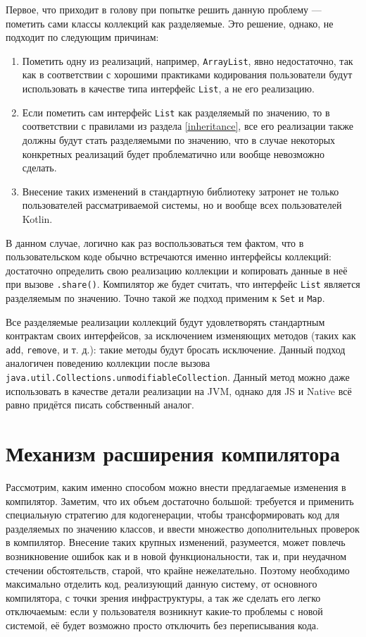 \documentclass[specification,annotation,times]{itmo-student-thesis}
\begin{document}
Первое, что приходит в голову при попытке решить данную проблему --- пометить сами классы коллекций как разделяемые.
Это решение, однако, не подходит по следующим причинам:

\begin{enumerate}
	\item Пометить одну из реализаций, например, \texttt{ArrayList}, явно недостаточно, так как в соответствии с хорошими практиками кодирования пользователи будут использовать в качестве типа интерфейс \texttt{List}, а не его реализацию.
	\item Если пометить сам интерфейс \texttt{List} как разделяемый по значению, то в соответствии с правилами из раздела \ref{inheritance}, все его реализации также должны будут стать разделяемыми по значению, что в случае некоторых конкретных реализаций будет проблематично или вообще невозможно сделать.
	\item Внесение таких изменений в стандартную библиотеку затронет не только пользователей рассматриваемой системы, но и вообще всех пользователей Kotlin.
\end{enumerate}

В данном случае, логично как раз воспользоваться тем фактом, что в пользовательском коде обычно встречаются именно интерфейсы коллекций: достаточно определить свою реализацию коллекции и копировать данные в неё при вызове \texttt{.share()}.
Компилятор же будет считать, что интерфейс \texttt{List} является разделяемым по значению.
Точно такой же подход применим к \texttt{Set} и \texttt{Map}.

Все разделяемые реализации коллекций будут удовлетворять стандартным контрактам своих интерфейсов, за исключением изменяющих методов (таких как \texttt{add}, \texttt{remove}, и т. д.): такие методы будут бросать исключение.
Данный подход аналогичен поведению коллекции после вызова \texttt{java.util.Collections.unmodifiableCollection}. Данный метод можно даже использовать в качестве детали реализации на JVM, однако для JS и Native всё равно придётся писать собственный аналог.


\section{Механизм расширения компилятора}

Рассмотрим, каким именно способом можно внести предлагаемые изменения в компилятор. Заметим, что их объем достаточно большой: требуется и применить специальную стратегию для кодогенерации, чтобы трансформировать код для разделяемых по значению классов, и ввести множество дополнительных проверок в компилятор.
Внесение таких крупных изменений, разумеется, может повлечь возникновение ошибок как и в новой функциональности, так и, при неудачном стечении обстоятельств, старой, что крайне нежелательно.
Поэтому необходимо максимально отделить код, реализующий данную систему, от основного компилятора, с точки зрения инфраструктуры, а так же сделать его легко отключаемым: если у пользователя возникнут какие-то проблемы с новой системой, её будет возможно просто отключить без переписывания кода.
\end{document}
